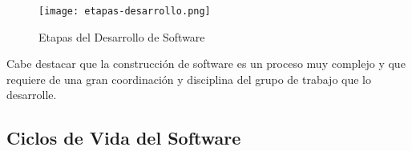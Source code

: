 \begin{figure}[h]
    \centering
    \texttt{[image: etapas-desarrollo.png]}
    \caption{Etapas del Desarrollo de Software}
\end{figure}

Cabe destacar que la construcción de software es un proceso muy complejo y que requiere de una gran coordinación y disciplina del grupo de trabajo que lo desarrolle.

\subsection{Ciclos de Vida del Software}















\glsaddall
\printglossaries


\newpage
{}



